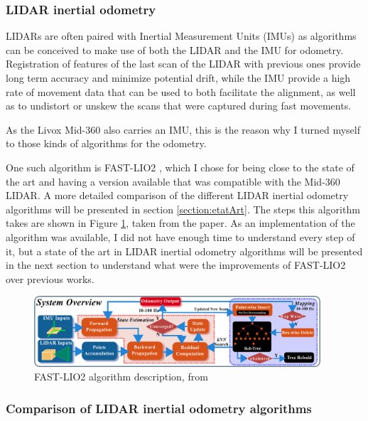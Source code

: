 \documentclass[12pt]{article}
\begin{document}
        \subsubsection{LIDAR inertial odometry}
        \label{section:lidar_inertial_odometry}
        LIDARs are often paired with Inertial Measurement Units (IMUs) as algorithms can be conceived to make use of both the LIDAR and the IMU for odometry. Registration of features of the last scan of the LIDAR with previous ones provide long term accuracy and minimize potential drift, while the IMU provide a high rate of movement data that can be used to both facilitate the alignment, as well as to undistort or unskew the scans that were captured during fast movements.
        
        As the Livox Mid-360 also carries an IMU, this is the reason why I turned myself to those kinds of algorithms for the odometry. 
        
        One such algorithm is FAST-LIO2 \cite{xu2022fast}, which I chose for being close to the state of the art and having a version available that was compatible with the Mid-360 LIDAR. A more detailed comparison of the different LIDAR inertial odometry algorithms will be presented in section \ref{section:etatArt}. The steps this algorithm takes are shown in Figure \ref{fig:fastlio2}, taken from the paper. As an implementation of the algorithm was available, I did not have enough time to understand every step of it, but a state of the art in LIDAR inertial odometry algorithms will be presented in the next section to understand what were the improvements of FAST-LIO2 over previous works.
        
        \begin{figure}[h]
            \centering
            \includegraphics[width=0.95\textwidth]{Images/overview_fastlio2.png}
            \caption{FAST-LIO2 algorithm description, from \cite{xu2022fast}}
            \label{fig:fastlio2}
        \end{figure}
        
        \subsubsection{Comparison of LIDAR inertial odometry algorithms}
\end{document}
